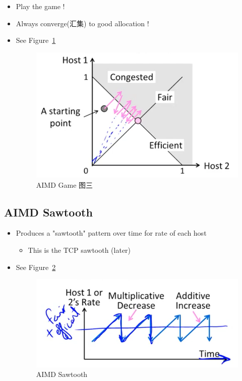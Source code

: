 \documentclass[12pt]{ctexart}   %
\begin{document}
\begin{itemize}
		 \item Play the game !
		 \item Always converge(汇集) to good allocation !
		 \item See Figure~\ref{fig:7-3-4}
		  
		 \begin{figure}[h!] %
		\centering
		 \includegraphics[scale=0.7]{images/7-3-4}
		\caption{ AIMD Game 图三}
		 \label{fig:7-3-4}
		 \end{figure}
		 
	\end{itemize}
	
	\subsection{AIMD Sawtooth}
	\begin{itemize}
		\item Produces a "sawtooth" pattern over time for rate of each host
		\begin{itemize}
			\item This is the TCP sawtooth (later)
		\end{itemize}
		\item See Figure~\ref{fig:7-3-5}
		  
		 \begin{figure}[h!] %
		\centering
		 \includegraphics[scale=0.7]{images/7-3-5}
		\caption{ AIMD Sawtooth }
		 \label{fig:7-3-5}
		 \end{figure}
	\end{itemize}
	
\end{document}
